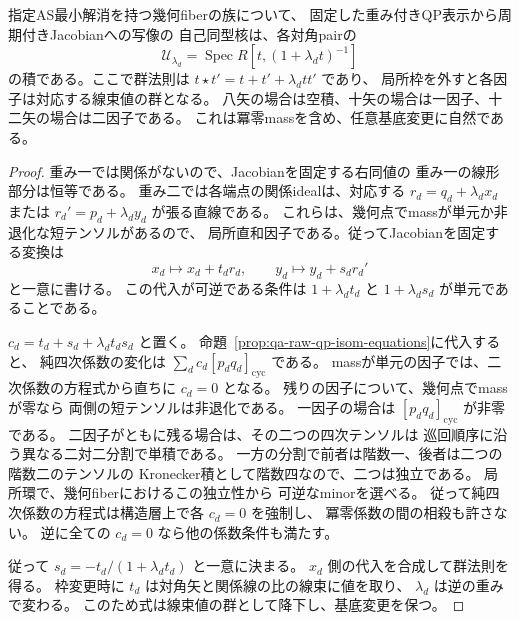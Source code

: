 \begin{corollary}[周期付きJacobianを固定する全raw右同値]
\label{cor:qa-raw-periodic-jacobian-kernel}
指定AS最小解消を持つ幾何fiberの族について、
固定した重み付きQP表示から周期付きJacobianへの写像の
自己同型核は、各対角pairの
\[
 \mathcal U_{\lambda_d}
   =\operatorname{Spec}R[t,(1+\lambda_dt)^{-1}]
\]
の積である。ここで群法則は $t\star t'=t+t'+\lambda_d tt'$ であり、
局所枠を外すと各因子は対応する線束値の群となる。
八矢の場合は空積、十矢の場合は一因子、十二矢の場合は二因子である。
これは冪零massを含め、任意基底変更に自然である。
\end{corollary}
\begin{proof}
重み一では関係がないので、Jacobianを固定する右同値の
重み一の線形部分は恒等である。
重み二では各端点の関係idealは、対応する
$r_d=q_d+\lambda_d x_d$ または
$r_d'=p_d+\lambda_d y_d$ が張る直線である。
これらは、幾何点でmassが単元か非退化な短テンソルがあるので、
局所直和因子である。従ってJacobianを固定する変換は
\[
 x_d\longmapsto x_d+t_d r_d,\qquad
 y_d\longmapsto y_d+s_d r_d'
\]
と一意に書ける。
この代入が可逆である条件は $1+\lambda_d t_d$ と
$1+\lambda_d s_d$ が単元であることである。

$c_d=t_d+s_d+\lambda_d t_ds_d$ と置く。
命題~\ref{prop:qa-raw-qp-isom-equations}に代入すると、
純四次係数の変化は
$\sum_d c_d[p_dq_d]_{\mathrm{cyc}}$ である。
massが単元の因子では、二次係数の方程式から直ちに $c_d=0$ となる。
残りの因子について、幾何点でmassが零なら
両側の短テンソルは非退化である。
一因子の場合は $[p_dq_d]_{\mathrm{cyc}}$ が非零である。
二因子がともに残る場合は、その二つの四次テンソルは
巡回順序に沿う異なる二対二分割で単積である。
一方の分割で前者は階数一、後者は二つの階数二のテンソルの
Kronecker積として階数四なので、二つは独立である。
局所環で、幾何fiberにおけるこの独立性から
可逆なminorを選べる。
従って純四次係数の方程式は構造層上で各 $c_d=0$ を強制し、
冪零係数の間の相殺も許さない。
逆に全ての $c_d=0$ なら他の係数条件も満たす。

従って $s_d=-t_d/(1+\lambda_dt_d)$ と一意に決まる。
$x_d$ 側の代入を合成して群法則を得る。
枠変更時に $t_d$ は対角矢と関係線の比の線束に値を取り、
$\lambda_d$ は逆の重みで変わる。
このため式は線束値の群として降下し、基底変更を保つ。
\end{proof}

